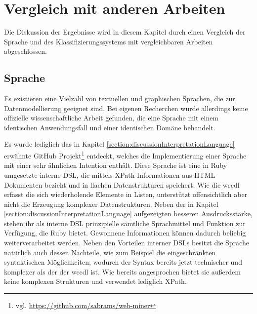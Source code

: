 \section{Vergleich mit anderen Arbeiten}
    Die Diskussion der Ergebnisse wird in diesem Kapitel
    durch einen Vergleich der Sprache und des Klassifizierungssystems
    mit vergleichbaren Arbeiten abgeschlossen.

    \subsection{Sprache}
        \label{section:discussionComparisonLanguage}
        Es existieren eine Vielzahl von textuellen und graphischen Sprachen,
        die zur Datenmodellierung geeignet sind.
        Bei eigenen Recherchen wurde allerdings keine offizielle wissenschaftliche Arbeit gefunden,
        die eine Sprache mit einem identischen Anwendungsfall und einer identischen Domäne behandelt.
        
        Es wurde lediglich das in Kapitel \ref{section:discussionInterpretationLanguage}
        erwähnte GitHub Projekt\footnote{vgl. \url{https://github.com/sabrams/web-miner}} entdeckt,
        welches die Implementierung einer Sprache mit einer sehr ähnlichen Intention enthält.
        Diese Sprache ist eine in Ruby umgesetzte interne DSL,
        die mittels XPath Informationen aus HTML-Dokumenten bezieht
        und in flachen Datenstrukturen speichert.
        Wie die \gls{wccdl} erfasst die sich wiederholende Elemente in Listen,
        unterstützt offensichtlich aber nicht die Erzeugung komplexer Datenstrukturen.
        Neben der in Kapitel \ref{section:discussionInterpretationLanguage} aufgezeigten besseren
        Ausdrucksstärke, stehen ihr als interne DSL prinzipielle sämtliche Sprachmittel und Funktion
        zur Verfügung, die Ruby bietet.
        Gewonnene Informationen können dadurch beliebig weiterverarbeitet werden.
        Neben den Vorteilen interner DSLs besitzt die Sprache natürlich auch dessen Nachteile,
        wie zum Beispiel die eingeschränkten syntaktischen Möglichkeiten,
        wodurch der Syntax bereits jetzt technischer und komplexer als der der \gls{wccdl} ist.
        Wie bereits angesprochen bietet sie außerdem keine komplexen Strukturen und verwendet lediglich XPath.

